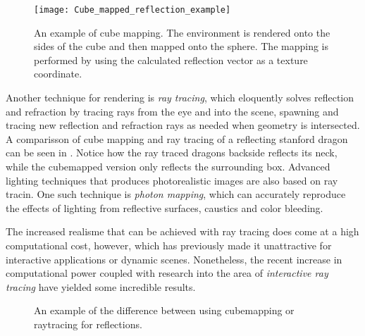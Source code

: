 \begin{figure}
  \centering
  \texttt{[image: Cube\_mapped\_reflection\_example]}
  \caption{An example of cube mapping. The environment is rendered
    onto the sides of the cube and then mapped onto the sphere. The
    mapping is performed by using the calculated reflection vector as
    a texture coordinate.}
  \label{fig:cubemap}
\end{figure}


Another technique for rendering is \textit{ray tracing}, which
eloquently solves reflection and refraction by tracing rays from the
eye and into the scene, spawning and tracing new reflection and
refraction rays as needed when geometry is intersected. A comparisson
of cube mapping and ray tracing of a reflecting stanford dragon can be
seen in . Notice how the ray traced
dragons backside reflects its neck, while the cubemapped version only
reflects the surrounding box. Advanced lighting techniques that
produces photorealistic images are also based on ray tracin. One such
technique is \textit{photon mapping}, which can accurately reproduce
the effects of lighting from reflective surfaces, caustics and color
bleeding.



The increased realisme that can be achieved with ray tracing does come
at a high computational cost, however, which has previously made it
unattractive for interactive applications or dynamic
scenes. Nonetheless, the recent increase in computational power
coupled with research into the area of \textit{interactive ray
  tracing} have yielded some incredible results.

\begin{figure}
  \centering
  \hspace{10pt}
  \caption[Cubemapping vs raytracing for reflections.]{An example of
    the difference between using cubemapping or raytracing for
    reflections.}
  \label{fig:reflectingDragons}
\end{figure}


